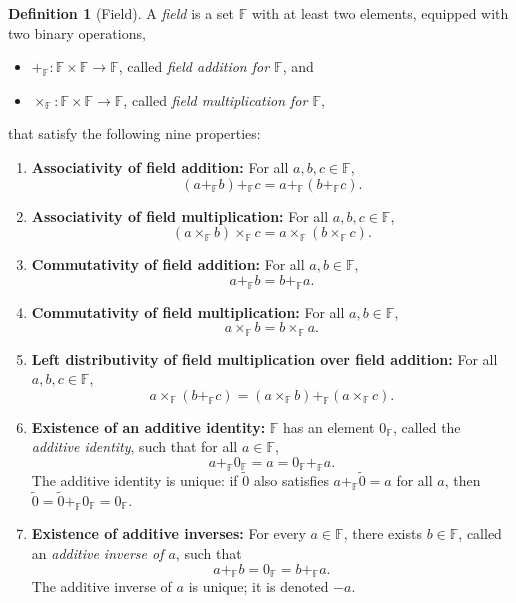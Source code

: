 \documentclass[11pt, a4paper, notitlepage]{report}
\theoremstyle{definition}
\newtheorem{definition}[theorem]{Definition}
\theoremstyle{remark}
\begin{document}
\begin{definition}[Field]\label{def:field}
A \emph{field} is a set $\mathbb{F}$ with at least two elements, equipped with two binary operations,
\begin{itemize}
  \item $+_{\mathbb{F}} : \mathbb{F} \times \mathbb{F} \to \mathbb{F}$, called \emph{field addition for $\mathbb{F}$}, and
  \item $\times_{\mathbb{F}} : \mathbb{F} \times \mathbb{F} \to \mathbb{F}$, called \emph{field multiplication for $\mathbb{F}$},
\end{itemize}
that satisfy the following nine properties:
\begin{enumerate}
  \item \textbf{Associativity of field addition:} For all $a, b, c \in \mathbb{F}$,
    \[ (a +_{\mathbb{F}} b) +_{\mathbb{F}} c = a +_{\mathbb{F}} (b +_{\mathbb{F}} c). \]
  \item \textbf{Associativity of field multiplication:} For all $a, b, c \in \mathbb{F}$,
    \[ (a \times_{\mathbb{F}} b) \times_{\mathbb{F}} c = a \times_{\mathbb{F}} (b \times_{\mathbb{F}} c). \]
  \item \textbf{Commutativity of field addition:} For all $a, b \in \mathbb{F}$,
    \[ a +_{\mathbb{F}} b = b +_{\mathbb{F}} a. \]
  \item \textbf{Commutativity of field multiplication:} For all $a, b \in \mathbb{F}$,
    \[ a \times_{\mathbb{F}} b = b \times_{\mathbb{F}} a. \]
  \item \textbf{Left distributivity of field multiplication over field addition:} For all $a, b, c \in \mathbb{F}$,
    \[ a \times_{\mathbb{F}} (b +_{\mathbb{F}} c) = (a \times_{\mathbb{F}} b) +_{\mathbb{F}} (a \times_{\mathbb{F}} c). \]
  \item \textbf{Existence of an additive identity:} $\mathbb{F}$ has an element $0_{\mathbb{F}}$, called the \emph{additive identity}, such that for all $a \in \mathbb{F}$,
    \[ a +_{\mathbb{F}} 0_{\mathbb{F}} = a = 0_{\mathbb{F}} +_{\mathbb{F}} a. \]
    The additive identity is unique: if $\tilde{0}$ also satisfies $a +_\mathbb{F} \tilde{0} = a$ for all $a$, then $\tilde{0} = \tilde{0} +_\mathbb{F} 0_\mathbb{F} = 0_\mathbb{F}$.
  \item \textbf{Existence of additive inverses:} For every $a \in \mathbb{F}$, there exists $b \in \mathbb{F}$, called an \emph{additive inverse of $a$}, such that
    \[ a +_{\mathbb{F}} b = 0_{\mathbb{F}} = b +_{\mathbb{F}} a. \]
    The additive inverse of $a$ is unique; it is denoted $-a$.

\end{enumerate}
\end{definition}
\end{document}
